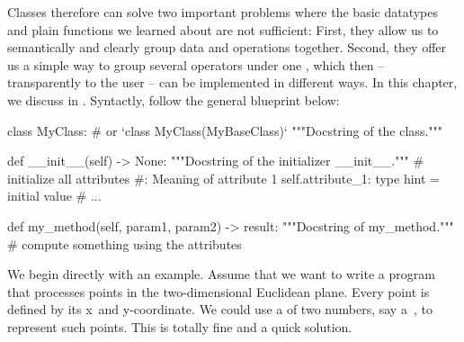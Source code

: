 Classes therefore can solve two important problems where the basic datatypes and plain functions we learned about are not sufficient:
First, they allow us to semantically and clearly group data and operations together.
Second, they offer us a simple way to group several operators under one , which then -- transparently to the user -- can be implemented in different ways.
In this chapter, we discuss  in \python.
Syntactly,  follow the general blueprint below:%
%
\begin{pythonSyntax}
class MyClass:   # or `class MyClass(MyBaseClass)`
    """Docstring of the class."""

    def __init__(self) -> None:
        """Docstring of the initializer __init__."""
        # initialize all attributes
        #: Meaning of attribute 1
        self.attribute_1: type hint = initial value
        # ...

    def my_method(self, param1, param2) -> result:
        """Docstring of my_method."""
        # compute something using the attributes
\end{pythonSyntax}
%
%
%
%
\label{sec:immutableClassPoints2D}%
%
%
%
%
%
We begin directly with an example.
Assume that we want to write a program that processes points in the two-dimensional Euclidean plane.
Every point is defined by its x\nobreakdashes~and y\nobreakdashes-coordinate.
We could use a  of two numbers, say a~, to represent such points.
This is totally fine and a quick solution.

